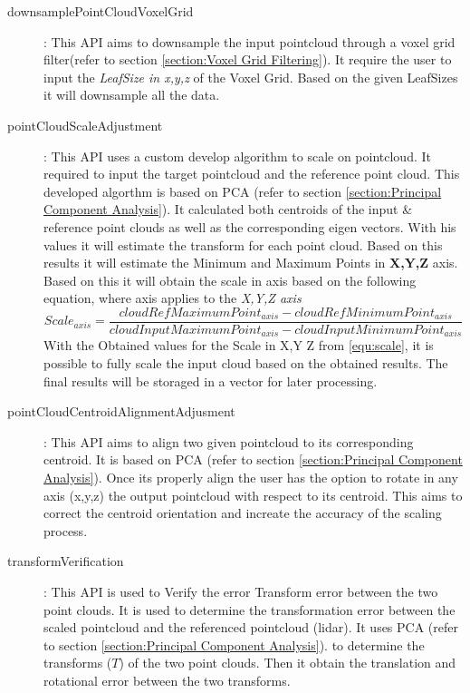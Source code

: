 \documentclass[12pt]{report}
\begin{document}
\begin{description}
   \item[downsamplePointCloudVoxelGrid] : This API aims to downsample the input pointcloud through a voxel grid  filter(refer to section \ref{section:Voxel Grid Filtering}). 
   It require the user to input the \textit{LeafSize in x,y,z} of the Voxel Grid. Based on the given LeafSizes it will downsample all the data.
   \item[pointCloudScaleAdjustment] : This API uses a custom develop algorithm to scale on pointcloud. It required to input the target pointcloud and the reference point cloud. 
   This developed algorthm is based on PCA (refer to section \ref{section:Principal Component Analysis}). It calculated both centroids of the input \& reference point clouds as well as the corresponding eigen vectors. With his values it will estimate the transform for each point cloud. Based on this results it will estimate the Minimum and Maximum Points in \textbf{X,Y,Z} axis.
   Based on this it will obtain the scale in axis based on the following equation, where axis applies to the \textit{X,Y,Z axis}
   \begin{equation}
     Scale_{axis} =  \frac{cloudRefMaximumPoint_{axis}-cloudRefMinimumPoint_{axis}}{cloudInputMaximumPoint_{axis}-cloudInputMinimumPoint_{axis}}
     \label{equ:scale}
   \end{equation}
With the Obtained values for the Scale in X,Y Z from \ref{equ:scale}, it is possible to fully scale the input cloud based on the obtained results. The final results will be storaged in a vector for later processing. 
   \item[pointCloudCentroidAlignmentAdjusment] : This API aims to align two given pointcloud to its corresponding centroid. It is based on PCA (refer to section \ref{section:Principal Component Analysis}). Once its properly align the user has the option to rotate in any axis (x,y,z) the output pointcloud with respect to its centroid. This aims to correct the centroid orientation and increate the accuracy of the scaling process. 
   \item[transformVerification] : This API is used to Verify the error Transform error between the two point clouds. It is used to determine the transformation error between the scaled pointcloud and the referenced pointcloud (lidar).
   It uses PCA (refer to section \ref{section:Principal Component Analysis}). to determine the transforms ($T$) of the two point clouds. Then it obtain the translation and rotational error between the two transforms. 
   

\end{description}
\end{document}
